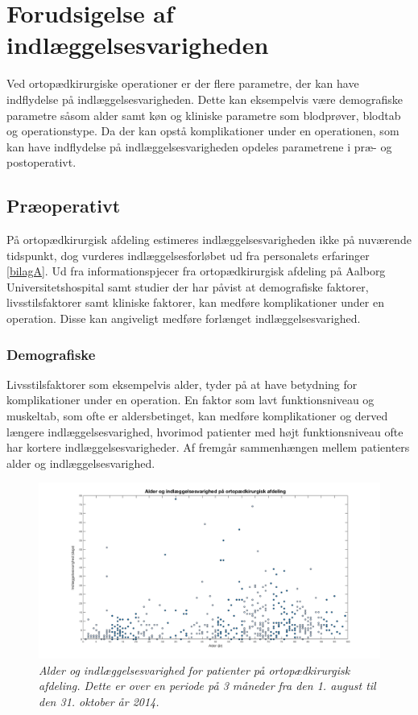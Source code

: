 \section{Forudsigelse af indlæggelsesvarigheden}
Ved ortopædkirurgiske operationer er der flere parametre, der kan have indflydelse på indlæggelsesvarigheden. Dette kan eksempelvis være demografiske parametre såsom alder samt køn og kliniske parametre som blodprøver, blodtab og operationstype. Da der kan opstå komplikationer under en operationen, som kan have indflydelse på indlæggelsesvarigheden opdeles parametrene i præ- og postoperativt.


\subsection{Præoperativt} \label{praeop}
På ortopædkirurgisk afdeling estimeres indlæggelsesvarigheden ikke på nuværende tidspunkt, dog vurderes indlæggelsesforløbet ud fra personalets erfaringer \ref{bilagA}. Ud fra informationspjecer fra ortopædkirurgisk afdeling på Aalborg Universitetshospital samt studier der har påvist at demografiske faktorer, livsstilsfaktorer samt kliniske faktorer, kan medføre komplikationer under en operation\cite{Nordjylland2014}. Disse kan angiveligt medføre forlænget indlæggelsesvarighed.


\subsubsection{Demografiske}
Livsstilsfaktorer som eksempelvis alder, tyder på at have betydning for komplikationer under en operation. En faktor som lavt funktionsniveau og muskeltab, som ofte er aldersbetinget, kan medføre komplikationer og derved længere indlæggelsesvarighed, hvorimod patienter med højt funktionsniveau ofte har kortere indlæggelsesvarigheder.\cite{Kehlet2001, Janssen2002} Af  fremgår sammenhængen mellem patienters alder og indlæggelsesvarighed. 


\begin{figure}[H]
	\centering
	\includegraphics[scale=0.3]{figures/alderogindlaeg}
	\caption{\textit{Alder og indlæggelsesvarighed for patienter på ortopædkirurgisk afdeling. Dette er over en periode på 3 måneder fra den 1. august til den 31. oktober år 2014.}}
	\label{alderogindlaeggelse}
\end{figure}


